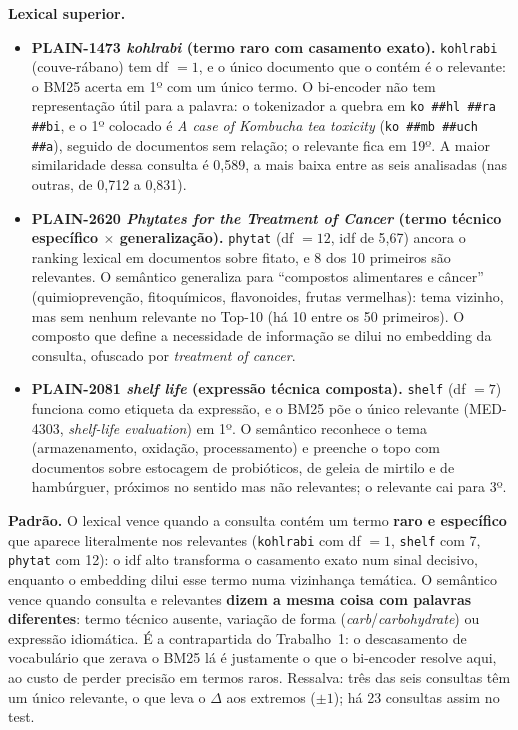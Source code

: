 \documentclass[10pt,a4paper]{article}
\newcommand{\med}[1]{\mbox{MED-#1}}         %
\newcommand{\pq}[1]{\mbox{PLAIN-#1}}        %
\begin{document}
\textbf{Lexical superior.}
\begin{itemize}
\item \textbf{\pq{1473} \emph{kohlrabi} (termo raro com casamento exato).} \texttt{kohlrabi} (couve-rábano) tem df $= 1$, e o único documento que o contém é o relevante: o BM25 acerta em 1º com um único termo. O bi-encoder não tem representação útil para a palavra: o tokenizador a quebra em \texttt{ko \#\#hl \#\#ra \#\#bi}, e o 1º colocado é \emph{A case of Kombucha tea toxicity} (\texttt{ko \#\#mb \#\#uch \#\#a}), seguido de documentos sem relação; o relevante fica em 19º. A maior similaridade dessa consulta é 0,589, a mais baixa entre as seis analisadas (nas outras, de 0,712 a 0,831).
\item \textbf{\pq{2620} \emph{Phytates for the Treatment of Cancer} (termo técnico específico $\times$ generalização).} \texttt{phytat} (df $= 12$, idf de 5,67) ancora o ranking lexical em documentos sobre fitato, e 8 dos 10 primeiros são relevantes. O semântico generaliza para ``compostos alimentares e câncer'' (quimioprevenção, fitoquímicos, flavonoides, frutas vermelhas): tema vizinho, mas sem nenhum relevante no Top-10 (há 10 entre os 50 primeiros). O composto que define a necessidade de informação se dilui no embedding da consulta, ofuscado por \emph{treatment of cancer}.
\item \textbf{\pq{2081} \emph{shelf life} (expressão técnica composta).} \texttt{shelf} (df $= 7$) funciona como etiqueta da expressão, e o BM25 põe o único relevante (\med{4303}, \emph{shelf-life evaluation}) em 1º. O semântico reconhece o tema (armazenamento, oxidação, processamento) e preenche o topo com documentos sobre estocagem de probióticos, de geleia de mirtilo e de hambúrguer, próximos no sentido mas não relevantes; o relevante cai para 3º.
\end{itemize}

\textbf{Padrão.} O lexical vence quando a consulta contém um termo \textbf{raro e específico} que aparece literalmente nos relevantes (\texttt{kohlrabi} com df $= 1$, \texttt{shelf} com 7, \texttt{phytat} com 12): o idf alto transforma o casamento exato num sinal decisivo, enquanto o embedding dilui esse termo numa vizinhança temática. O semântico vence quando consulta e relevantes \textbf{dizem a mesma coisa com palavras diferentes}: termo técnico ausente, variação de forma (\emph{carb}/\emph{carbohydrate}) ou expressão idiomática. É a contrapartida do Trabalho~1: o descasamento de vocabulário que zerava o BM25 lá é justamente o que o bi-encoder resolve aqui, ao custo de perder precisão em termos raros. Ressalva: três das seis consultas têm um único relevante, o que leva o $\Delta$ aos extremos ($\pm 1$); há 23 consultas assim no test.
\end{document}
